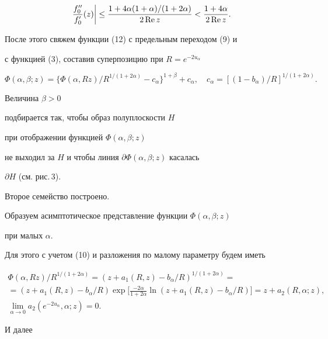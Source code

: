 \begin{pf}
\begin{multline}
\frac{f''_0}{f'_0}(z)\bigg|\le 


\frac{1+4\alpha(1+\alpha)/(1+2\alpha)}{2\re z}< 


\frac{1+4\alpha}{2\re z}. 


\end{multline} 


После этого свяжем функции (12) с предельным переходом (9) и 


с функцией (3), составив суперпозицию при $R=e^{-2u_\alpha}$ 


$$ 


\Phi(\alpha,\beta;z)=\{\Phi(\alpha,Rz)/ 


R^{1/(1+2\alpha)}-c_\alpha\}^{1+\beta}+c_\alpha,\quad 


c_\alpha=[(1-b_\alpha)/R]^{1/(1+2\alpha)}. 


$$ 


Величина $\beta>0$ 


подбирается так, чтобы образ полуплоскости $H$ 


при отображении функцией $\Phi(\alpha,\beta;z)$ 


не выходил за $H$ и чтобы линия $\partial\Phi(\alpha,\beta;z)$ касалась 


$\partial H$ (см. рис.\,3). 


Второе семейство построено. 


 


Образуем асимптотическое представление функции $\Phi(\alpha,\beta;z)$ 


при малых $\alpha$. 


Для этого с учетом (10) и разложения по малому параметру будем иметь 


\begin{gather*} 


\Phi(\alpha,Rz)/R^{1/(1+2\alpha)}=(z+a_1(R,z)- 


b_\alpha/R)^{1/(1+2\alpha)} =\\ 


=(z+a_1(R,z)-b_\alpha/R)\exp\bigg[\frac{-2\alpha}{1+2\alpha} 


\ln(z+a_1(R,z)-b_\alpha/R)\bigg]=z+a_2(R,\alpha;z),\\


\lim_{\alpha\to 0}a_2(e^{-2u_\alpha},\alpha;z)=0. 


\end{gather*} 


И далее 


\begin{align} 



\end{align}
\end{pf}
